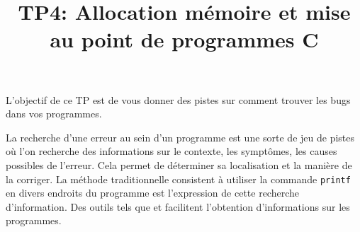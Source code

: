 \documentclass[10pt]{article}\usepackage[nu]{esial}
\begin{document}
\title{TP4: Allocation mémoire et mise au point de programmes C}
\maketitle

\newcommand{\I}{\hspace{1.5em}}


L'objectif de ce TP est de vous donner des pistes sur comment trouver les bugs
dans vos programmes.

La recherche d'une erreur au sein d'un programme est une sorte de jeu de pistes
où l'on recherche des informations sur le contexte, les symptômes, les causes
possibles de l'erreur. Cela permet de déterminer sa localisation et la manière
de la corriger.  La méthode traditionnelle consistent à utiliser la commande
\texttt{printf} en divers endroits du programme est l'expression de cette
recherche d'information. Des outils tels que  et 
facilitent l'obtention d'informations sur les programmes.
\end{document}
